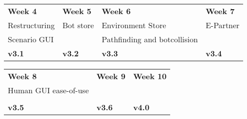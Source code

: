 \begin{tabular}{|l|l|l|l|}
\textbf{Week 4} & \textbf{Week 5} 	& \textbf{Week 6} 		& \textbf{Week 7}\\ 
Restructuring 	& Bot store 		& Environment Store 	& E-Partner\\ 
Scenario GUI 	& 				& Pathfinding and botcollision\\
\textbf{v3.1} 	& \textbf{v3.2} 	& \textbf{v3.3} 		& \textbf{v3.4} 			
\end{tabular}

\begin{tabular}{|l|l|l|}
\textbf{Week 8} 			& \textbf{Week 9} 	& \textbf{Week 10} \\
Human GUI ease-of-use 		& 			& \\
	 				& 			& \\
\textbf{v3.5} 			& \textbf{v3.6} 	& \textbf{v4.0} 
\end{tabular}